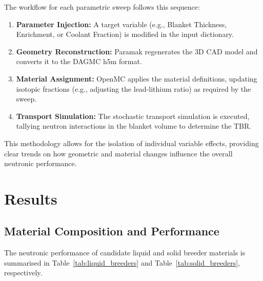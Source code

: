 \documentclass[12pt]{article}
\begin{document}
The workflow for each parametric sweep follows this sequence:
\begin{enumerate}
    \item \textbf{Parameter Injection:} A target variable (e.g., Blanket Thickness, 
    Enrichment, or Coolant Fraction) is modified in the input dictionary.
    \item \textbf{Geometry Reconstruction:} Paramak regenerates the 3D CAD model and
    converts it to the DAGMC h5m format.
    \item \textbf{Material Assignment:} OpenMC applies the material definitions, updating
    isotopic fractions (e.g., adjusting the lead-lithium ratio) as required by the sweep.
    \item \textbf{Transport Simulation:} The stochastic transport simulation is executed, tallying
    neutron interactions in the blanket volume to determine the TBR.
\end{enumerate}

This methodology allows for the isolation of individual variable effects, providing clear trends on
how geometric and material changes influence the overall neutronic performance.



\section{Results}
\label{sec:results}

\subsection{Material Composition and Performance}

The neutronic performance of candidate liquid and solid breeder materials is summarised in
Table~\ref{tab:liquid_breeders} and Table~\ref{tab:solid_breeders}, respectively.
\end{document}

